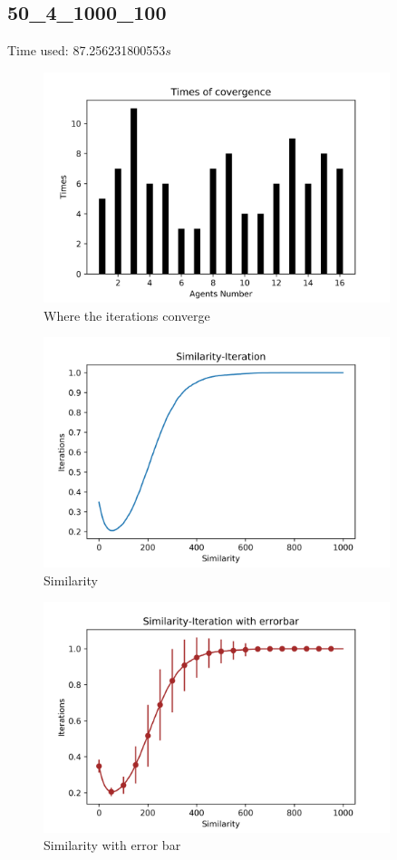 \documentclass[a4paper,12pt]{article}
\begin{document}
	\subsection{50\_4\_1000\_100}
	Time used: 87.256231800553$s$
	\begin{figure}[H]
		\centering
		\includegraphics[width=0.9\textwidth]{agt50_4_1000_100}
		\caption{Where the iterations converge}\label{agt50_4_1000_100}
	\end{figure}
	\begin{figure}[H]
		\centering
		\includegraphics[width=0.9\textwidth]{Sim50_4_1000_100}
		\caption{Similarity}\label{Sim50_4_1000_100}
	\end{figure}
	\begin{figure}[H]
		\centering
		\includegraphics[width=0.9\textwidth]{SimErr50_4_1000_100}
		\caption{Similarity with error bar}\label{SimErr50_4_1000_100}
	\end{figure}
\end{document}
